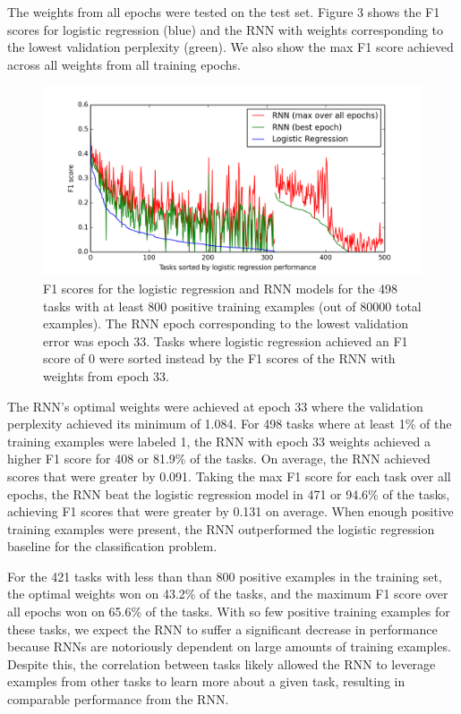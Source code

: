 \documentclass{article} %
\begin{document}
The weights from all epochs were tested on the test set. Figure 3 shows the F1 scores for logistic regression (blue) and the RNN with weights corresponding to the lowest validation perplexity (green). We also show the max F1 score achieved across all weights from all training epochs.

\begin{figure}[!htb]
	\centering
	\includegraphics[scale=0.6]{F1_scores_498}
	\caption{F1 scores for the logistic regression and RNN models for the 498 tasks with at least 800 positive training examples (out of 80000 total examples). The RNN epoch corresponding to the lowest validation error was epoch 33. Tasks where logistic regression achieved an F1 score of 0 were sorted instead by the F1 scores of the RNN with weights from epoch 33.}
\end{figure}

The RNN's optimal weights were achieved at epoch 33 where the validation perplexity achieved its minimum of 1.084. For 498 tasks where at least 1\% of the training examples were labeled 1, the RNN with epoch 33 weights achieved a higher F1 score for 408 or 81.9\% of the tasks. On average, the RNN achieved scores that were greater by 0.091. Taking the max F1 score for each task over all epochs, the RNN beat the logistic regression model in 471 or 94.6\% of the tasks, achieving F1 scores that were greater by 0.131 on average. When enough positive training examples were present, the RNN outperformed the logistic regression baseline for the classification problem.

For the 421 tasks with less than than 800 positive examples in the training set, the optimal weights won on 43.2\% of the tasks, and the maximum F1 score over all epochs won on 65.6\% of the tasks. With so few positive training examples for these tasks, we expect the RNN to suffer a significant decrease in performance because RNNs are notoriously dependent on large amounts of training examples. Despite this, the correlation between tasks likely allowed the RNN to leverage examples from other tasks to learn more about a given task, resulting in comparable performance from the RNN.
\end{document}
